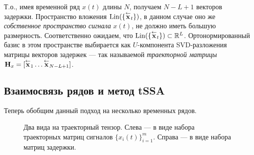 		 	Т.о., имея временной ряд $ x(t) $ длины $ N $, получаем $ N - L + 1 $ векторов задержки. Пространство вложения $ \text{Lin}(\{\overset{\leftarrow}{\mathbf{x}}_{t}\}) $, в данном случае оно же \emph{собственное пространство сигнала} $ x(t) $, не должно иметь большую размерность. Соответственно ожидаем, что $ \text{Lin}(\{\overset{\leftarrow}{\mathbf{x}}_{t}\}) \subset \mathbb{R}^L $. Ортонормированный базис в этом пространстве выбирается как $ U $-компонента SVD-разложения матрицы векторов задержек --- так называемой \emph{траекторной матрицы} $ \mathbf{H}_x = [ \overset{\leftarrow}{\mathbf{x}}_{1} \ldots  \overset{\leftarrow}{\mathbf{x}}_{N - L + 1}] $.
		 	
		 \subsection*{Взаимосвязь рядов и метод tSSA}
		 
		 	Теперь обобщим данный подход на несколько временных рядов.
		 
		 	\begin{figure}[h]
		 		\centering
		 		
		 		\caption{Два вида на траекторный тензор. Слева --- в виде набора траекторных матриц сигналов $ \{x_i(t)\}_{i=1}^m $. Справа --- в виде набора матриц задержки.}\label{pic:traj_tensor}
		 	\end{figure}
	    
